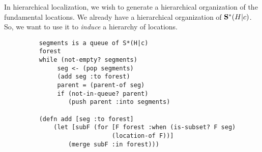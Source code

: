 In hierarchical localization, we wish to generate a hierarchical organization of
the fundamental locations. We already have a hierarchical organization of
$\mathbf{S}^*(H|c)$.  So, we want to use it to {\em induce} a hierarchy of
locations.

\begin{figure*}
    \begin{verbatim}
    segments is a queue of S*(H|c)
    forest
    while (not-empty? segments)
         seg <- (pop segments)
         (add seg :to forest)
         parent = (parent-of seg)
         if (not-in-queue? parent)
            (push parent :into segments)

    (defn add [seg :to forest]
        (let [subF (for [F forest :when (is-subset? F seg)
                        (location-of F))]
            (merge subF :in forest)))
    \end{verbatim}
\end{figure*}


